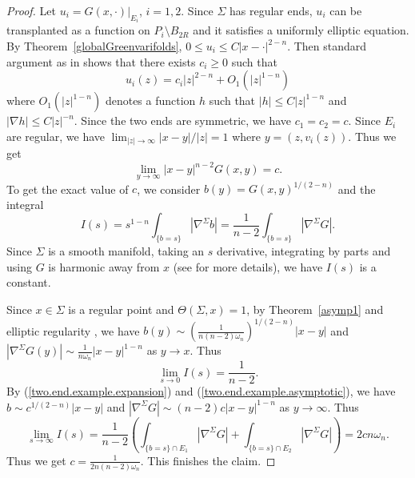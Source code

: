 \documentclass[11pt]{amsart}
\theoremstyle{definition}
\newtheorem{example}[theorem]{Example}
\newcommand{\R}{\mathbb{R}}
\begin{document}
\begin{proof}
    
Let $u_i=G(x,\cdot)|_{E_i}$, $i=1,2$. Since $\Sigma$ has regular ends, $u_i$ can be transplanted as a function on $P_i\setminus B_{2R}$ and it satisfies a uniformly elliptic equation. By Theorem~\ref{globalGreenvarifolds}, $0\le u_i\le C|x-\cdot |^{2-n}$. Then standard argument as in \cite[Proof of Proposition 3]{Sch83} shows that there exists $c_i\ge 0$ such that
\begin{equation}\label{two.end.example.expansion}
	u_i(z)=c_i|z|^{2-n}+O_1(|z|^{1-n})
\end{equation} where $O_1(|z|^{1-n})$ denotes a function $h$  such that $|h|\le C|z|^{1-n}$ and $|\nabla h|\le C|z|^{-n}$. Since the two ends are symmetric, we have $c_1=c_2=c$. Since $E_i$ are regular, we have $\lim_{|z|\to\infty}|x-y|/|z|= 1$ where $y=(z,v_i(z))$. Thus we get 
\begin{equation}\label{two.end.example.asymptotic}
\lim_{y\to\infty} |x-y|^{n-2}G(x,y)=c.
\end{equation} To get the exact value of $c$, we consider  $b(y)=G(x,y)^{1/(2-n)}$ and the integral \[I(s)=s^{1-n}\int _{\{b=s\}}|\nabla^\Sigma b|=\frac{1}{n-2}\int_{\{b=s\}}|\nabla^\Sigma G|.\] Since $\Sigma$ is a smooth manifold, taking an $s$ derivative, integrating by parts and using $G$ is harmonic away from $x$ (see \cite[(2.6),(2.12)]{CM2} for more details), we have $I(s)$ is a constant.

Since $x\in \Sigma$ is a regular point and $\Theta(\Sigma,x)=1$,  by Theorem~\ref{asymp1} and elliptic regularity \cite{GT}, we have $b(y)\sim (\frac{1}{n(n-2)\omega_n})^{1/(2-n)}|x-y|$ and $|\nabla^\Sigma G(y)|\sim \frac{1}{n\omega_n}|x-y|^{1-n}$ as $y\to x$. Thus
\[\lim_{s\to0}I(s)=\frac{1}{n-2}.\]
By (\ref{two.end.example.expansion}) and (\ref{two.end.example.asymptotic}), we have $b\sim c^{1/(2-n)}|x-y|$ and $|\nabla^\Sigma G|\sim (n-2)c|x-y|^{1-n}$ as $y\to\infty$. Thus 
\[\lim_{s\to\infty}I(s)=\frac{1}{n-2}(\int _{\{b=s\}\cap E_1}|\nabla^\Sigma G|+\int_{\{b=s\}\cap E_2}|\nabla^\Sigma G|)=2cn\omega_n.\]
Thus we get $c=\frac{1}{2n(n-2)\omega_n}$. This finishes the claim.
\end{proof}
	
\end{document}
